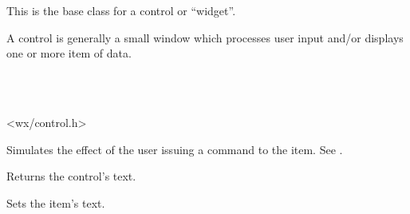 \section{}\label{wxcontrol}

This is the base class for a control or ``widget''.

A control is generally a small window which processes user input and/or
displays one or more item of data.


\\
\\


<wx/control.h>





\label{wxcontrolcommand}


Simulates the effect of the user issuing a command to the item. See .


\label{wxcontrolgetlabel}


Returns the control's text.


\label{wxcontrolsetlabel}


Sets the item's text.

